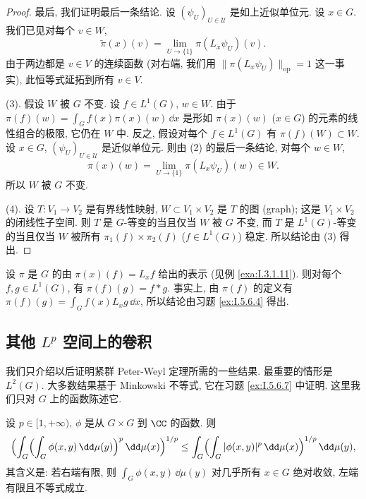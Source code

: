 \begin{proof}
最后, 我们证明最后一条结论. 设 $(\psi_U)_{U \in \mathcal{U}}$ 是如上近似单位元. 设 $x \in G$. 我们已见对每个 $v \in W$,
\[
\tilde{\pi}(x)(v) = \lim_{U \to \{1\}}\pi(L_x\psi_U)(v).
\]
由于两边都是 $v \in V$ 的连续函数 (对右端, 我们用 $\|\pi(L_x\psi_U)\|_{\mathrm{op}} = 1$ 这一事实), 此恒等式延拓到所有 $v \in V$.

(3). 假设 $W$ 被 $G$ 不变. 设 $f \in L^1(G)$, $w \in W$. 由于 $\pi(f)(w) = \int_G f(x)\pi(x)(w)\,\dd x$ 是形如 $\pi(x)(w)$ ($x \in G$) 的元素的线性组合的极限, 它仍在 $W$ 中.
反之, 假设对每个 $f \in L^1(G)$ 有 $\pi(f)(W) \subset W$. 设 $x \in G$, $(\psi_U)_{U \in \mathcal{U}}$ 是近似单位元. 则由 (2) 的最后一条结论, 对每个 $w \in W$,
\[
\pi(x)(w) = \lim_{U \to \{1\}}\pi(L_x\psi_U)(w) \in W.
\]
所以 $W$ 被 $G$ 不变.

(4). 设 $T \colon V_1 \to V_2$ 是有界线性映射, $W \subset V_1 \times V_2$ 是 $T$ 的图 (graph); 这是 $V_1 \times V_2$ 的闭线性子空间. 则 $T$ 是 $G$-等变的当且仅当 $W$ 被 $G$ 不变, 而 $T$ 是 $L^1(G)$-等变的当且仅当 $W$ 被所有 $\pi_1(f) \times \pi_2(f)$ ($f \in L^1(G)$) 稳定. 所以结论由 (3) 得出.
\end{proof}

\begin{example}[左正则表示与卷积]
\label{exa:I.4.2.7}
设 $\pi$ 是 $G$ 的由 $\pi(x)(f) = L_xf$ 给出的表示 (见例 \ref{exa:I.3.1.11}). 则对每个 $f, g \in L^1(G)$, 有 $\pi(f)(g) = f * g$. 事实上, 由 $\pi(f)$ 的定义有 $\pi(f)(g) = \int_G f(x)L_xg\,\dd x$, 所以结论由习题 \ref{ex:I.5.6.4} 得出.
\end{example}

\subsection{\texorpdfstring{其他 $L^p$ 空间上的卷积}{其他 L^p 空间上的卷积}}

我们只介绍以后证明紧群 Peter-Weyl 定理所需的一些结果. 最重要的情形是 $L^2(G)$.
大多数结果基于 Minkowski 不等式, 它在习题 \ref{ex:I.5.6.7} 中证明. 这里我们只对 $G$ 上的函数陈述它.

\begin{proposition}
\label{prop:I.4.3.1}
设 $p \in [1, +\infty)$, $\phi$ 是从 $G \times G$ 到 $\CC$ 的函数. 则
\[
\Bigl(\int_G \Bigl(\int_G \phi(x, y)\,\dd\mu(y)\Bigr)^p \,\dd\mu(x)\Bigr)^{1/p} \leq \int_G \Bigl(\int_G |\phi(x, y)|^p \,\dd\mu(x)\Bigr)^{1/p} \,\dd\mu(y),
\]
其含义是: 若右端有限, 则 $\int_G \phi(x, y)\,\dd\mu(y)$ 对几乎所有 $x \in G$ 绝对收敛, 左端有限且不等式成立.
\end{proposition}

